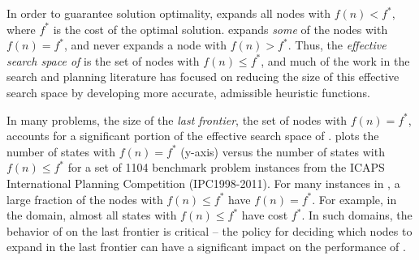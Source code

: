 In order to guarantee solution optimality, \astar expands all
nodes with $f(n) < f^*$, where $f^*$ is the cost of the optimal solution.
\astar expands \emph{some} of the nodes with $f(n) = f^*$, and never expands a node with $f(n) > f^*$.
Thus, the \emph{effective search space of \astar} is the set of nodes with 
$f(n) \leq f^*$, and
much of the work in the search and planning literature  has focused
on reducing the size of this effective search space by
developing more accurate, admissible heuristic functions.

In many problems, the size of the \emph{last frontier}, the set of nodes with $f(n)=f^*$, accounts for a significant portion of the effective search space of \astar.
 plots the number of states with $f(n) = f^*$ (y-axis)
versus the number of states with $f(n) \leq f^*$
for a set of 1104 benchmark problem instances from the ICAPS International Planning Competition (IPC1998-2011).
For many instances in ,  a large fraction of the nodes with $f(n) \leq f^*$ have $f(n)=f^*$.
For example, in the  domain, almost all states with $f(n) \leq f^*$ have cost $f^*$.
In such domains, the behavior of \astar on the last frontier is critical -- the policy for deciding which nodes to expand in the last frontier can have a significant impact on the performance of \astar.

